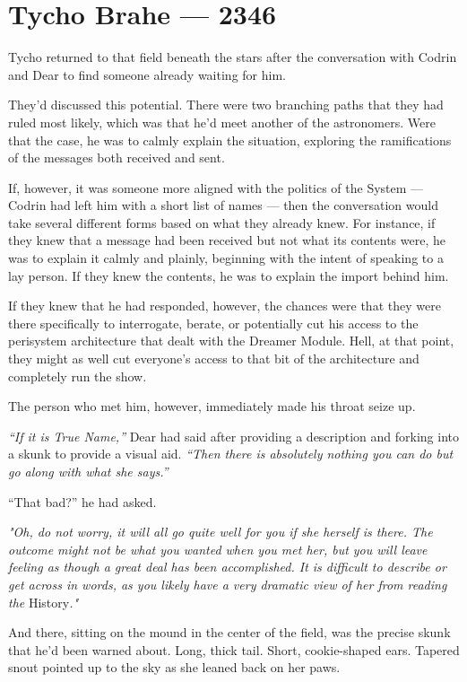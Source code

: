 \hypertarget{tycho-brahe-2346}{%
\chapter{Tycho Brahe — 2346}\label{tycho-brahe-2346}}

Tycho returned to that field beneath the stars after the conversation with Codrin and Dear to find someone already waiting for him.

They'd discussed this potential. There were two branching paths that they had ruled most likely, which was that he'd meet another of the astronomers. Were that the case, he was to calmly explain the situation, exploring the ramifications of the messages both received and sent.

If, however, it was someone more aligned with the politics of the System — Codrin had left him with a short list of names — then the conversation would take several different forms based on what they already knew. For instance, if they knew that a message had been received but not what its contents were, he was to explain it calmly and plainly, beginning with the intent of speaking to a lay person. If they knew the contents, he was to explain the import behind him.

If they knew that he had responded, however, the chances were that they were there specifically to interrogate, berate, or potentially cut his access to the perisystem architecture that dealt with the Dreamer Module. Hell, at that point, they might as well cut everyone's access to that bit of the architecture and completely run the show.

The person who met him, however, immediately made his throat seize up.

\emph{``If it is True Name,''} Dear had said after providing a description and forking into a skunk to provide a visual aid. \emph{``Then there is absolutely nothing you can do but go along with what she says.''}

``That bad?'' he had asked.

\emph{"Oh, do not worry, it will all go quite well for you if she herself is there. The outcome might not be what you wanted when you met her, but you will leave feeling as though a great deal has been accomplished. It is difficult to describe or get across in words, as you likely have a very dramatic view of her from reading the} History\emph{."}

And there, sitting on the mound in the center of the field, was the precise skunk that he'd been warned about. Long, thick tail. Short, cookie-shaped ears. Tapered snout pointed up to the sky as she leaned back on her paws.

